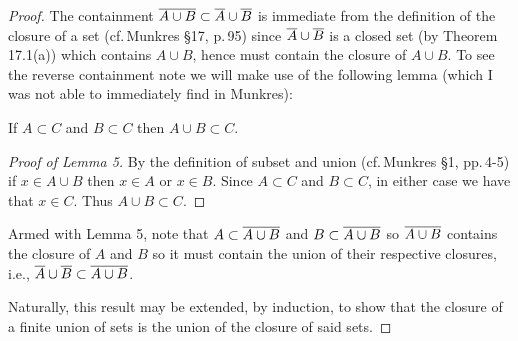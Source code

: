 \begin{proof}
The containment $\overline{A\cup B}\subset\overline{A}\cup\overline{B}$ is
immediate from the definition of the closure of a set
(cf.\,Munkres \S17, p.\,95) since $\overline{A}\cup\overline{B}$ is a closed
set (by Theorem 17.1(a)) which contains $A\cup B$, hence must
contain the closure of $A\cup B$. To see the reverse containment
note we will make use of the following lemma (which I was not
able to immediately find in Munkres):
\begin{lemma}
If $A\subset C$ and $B\subset C$ then $A\cup B\subset C$.
\end{lemma}
\begin{proof}[Proof of Lemma 5]
\renewcommand\qedsymbol{$\clubsuit$}
By the definition of subset and union (cf.\,Munkres \S1,
pp.\,4-5) if $x\in A\cup B$ then $x\in A$ or $x\in B$. Since
$A\subset C$ and $B\subset C$, in either case we have that $x\in
C$. Thus $A\cup B\subset C$.
\end{proof}
\noindent Armed with Lemma 5, note that $A\subset\overline{A\cup B}$
and $B\subset\overline{A\cup B}$ so $\overline{A\cup B}$ contains the
closure of $A$ and $B$ so it must contain the union of their
respective closures, i.e., $\overline{A}\cup\overline{B}\subset\overline{A\cup
  B}$.

Naturally, this result may be extended, by induction, to show
that the closure of a finite union of sets is the union of the
closure of said sets.
\end{proof}

